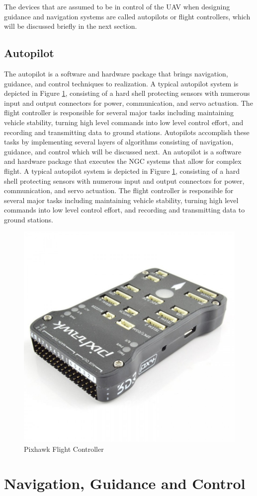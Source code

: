 \documentclass[numbered,pdftex]{ohio-etd}
\begin{document}
The devices that are assumed to be in control of the UAV when designing guidance and navigation systems are called autopilots or flight controllers, which will be discussed briefly in the next section. 


\subsection{Autopilot}
The autopilot is a software and hardware package that brings navigation, guidance, and control techniques to realization. A typical autopilot system is depicted in Figure \ref{fig:pixhawk}, consisting of a hard shell protecting sensors with numerous input and output connectors for power, communication, and servo actuation. The flight controller is responsible for several major tasks including maintaining vehicle stability, turning high level commands into low level control effort, and recording and transmitting data to ground stations. Autopilots accomplish these tasks by implementing several layers of algorithms consisting of navigation, guidance, and control which will be discussed next. An autopilot is a software and hardware package that executes the NGC systems that allow for complex flight. A typical autopilot system is depicted in Figure \ref{fig:pixhawk}, consisting of a hard shell protecting sensors with numerous input and output connectors for power, communication, and servo actuation. The flight controller is responsible for several major tasks including maintaining vehicle stability, turning high level commands into low level control effort, and recording and transmitting data to ground stations.

\begin{figure}[h]
	\centering
	\includegraphics[width=0.\linewidth]{PaperFigures/pixhawk}
	\caption{Pixhawk Flight Controller}
	\label{fig:pixhawk}
\end{figure}


\section{Navigation, Guidance and Control} \label{NGC}
\end{document}
